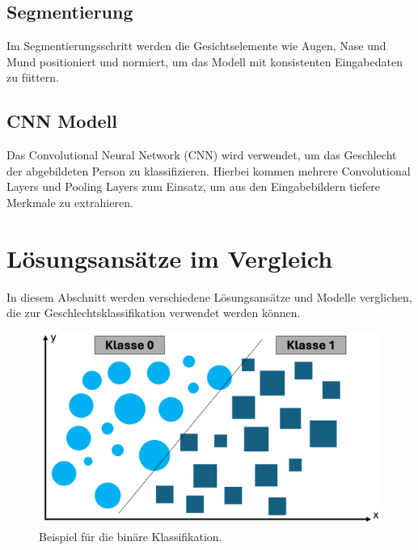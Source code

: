 \documentclass[journal,twoside,web]{ieeecolor}
\begin{document}
\subsection{Segmentierung}
Im Segmentierungsschritt werden die Gesichtselemente wie Augen, Nase und Mund positioniert und normiert, um das Modell mit konsistenten Eingabedaten zu füttern.

\subsection{CNN Modell}
Das Convolutional Neural Network (CNN) wird verwendet, um das Geschlecht der abgebildeten Person zu klassifizieren. Hierbei kommen mehrere Convolutional Layers und Pooling Layers zum Einsatz, um aus den Eingabebildern tiefere Merkmale zu extrahieren.

\section{Lösungsansätze im Vergleich}
In diesem Abschnitt werden verschiedene Lösungsansätze und Modelle verglichen, die zur Geschlechtsklassifikation verwendet werden können.
\begin{figure}[!t]
    \centerline{\includegraphics[width=\columnwidth]{Andi/binaere_klassifikation.png}}
    \caption{Beispiel für die binäre Klassifikation.}
    \label{fig:binaere_klassifikation}
\end{figure}
\end{document}
